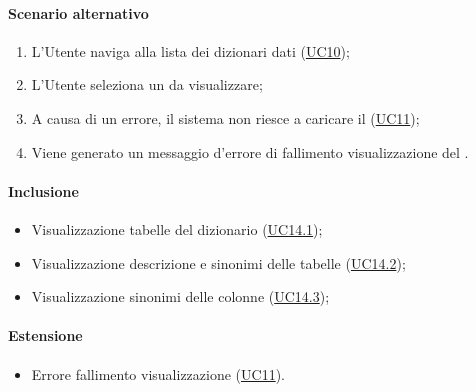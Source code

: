 \paragraph*{Scenario alternativo}
\begin{enumerate}
  \item L’Utente naviga alla lista dei dizionari dati (\hyperref[UC10]{UC10});
  \item L'Utente seleziona un  da visualizzare;
  \item A causa di un errore, il sistema non riesce a caricare il  (\hyperref[UC11]{UC11});
  \item Viene generato un messaggio d'errore di fallimento visualizzazione del .
\end{enumerate}

\paragraph*{Inclusione}
\begin{itemize}
  \item Visualizzazione tabelle del dizionario (\hyperref[UC14point1]{UC14.1});
  \item Visualizzazione descrizione e sinonimi delle tabelle (\hyperref[UC14point2]{UC14.2});
  \item Visualizzazione sinonimi delle colonne (\hyperref[UC14point3]{UC14.3});
\end{itemize}

\paragraph*{Estensione}
\begin{itemize}
  \item Errore fallimento visualizzazione  (\hyperref[UC11]{UC11}).
\end{itemize}


